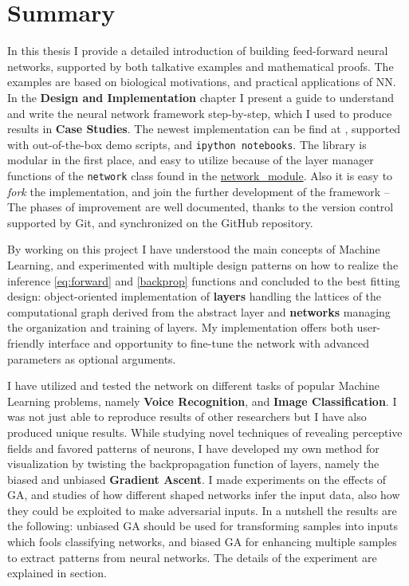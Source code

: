 \chapter{Summary}

In this thesis I provide a detailed introduction of building feed-forward neural networks, supported by both talkative examples and mathematical proofs. 
The examples are based on biological motivations, and practical applications of NN. 
In the \textbf{Design and Implementation} chapter I present a guide to understand and write the neural network framework step-by-step, which I used to produce results in \textbf{Case Studies}. 
The newest implementation can be find at \cite{DV}, supported with out-of-the-box demo scripts, and \texttt{ipython notebooks}.
The library is modular in the first place, and easy to utilize because of the layer manager functions of the \texttt{network} class found in the \url{network_module}. 
Also it is easy to \emph{fork} the implementation, and join the further development of the framework -- The phases of improvement are well documented, thanks to the version control supported by Git, and synchronized on the GitHub repository.

By working on this project I have understood the main concepts of Machine Learning, and experimented with multiple design patterns on how to realize the inference \ref{eq:forward} and \ref{backprop} functions and concluded to the best fitting design: 
object-oriented implementation of \textbf{layers} handling the lattices of the computational graph derived from the abstract layer and \textbf{networks} managing the organization and training of layers.
My implementation offers both user-friendly interface and opportunity to fine-tune the network with advanced parameters as optional arguments.

I have utilized and tested the network on different tasks of popular Machine Learning problems, namely \textbf{Voice Recognition}, and \textbf{Image Classification}.
I was not just able to reproduce results of other researchers but I have also produced unique results.
While studying novel techniques of revealing perceptive fields and favored patterns of neurons, 
I have developed my own method for visualization by twisting the backpropagation function of layers, namely the biased and unbiased \textbf{Gradient Ascent}.
I made experiments on the effects of GA, and studies of how different shaped networks infer the input data, also how they could be exploited to make adversarial inputs. In a nutshell the results are the following: unbiased GA should be used for transforming samples into inputs which fools classifying networks, and biased GA for enhancing multiple samples to extract patterns from neural networks. The details of the experiment are explained in \textbf{} section.
